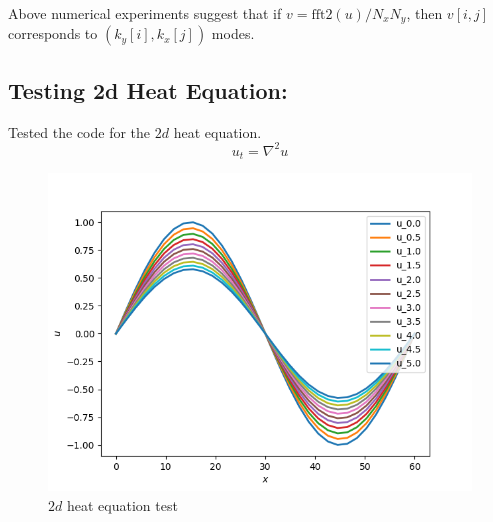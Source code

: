 \documentclass{article}
\begin{document}
Above numerical experiments suggest that if $v = \textrm{fft2}(u)/N_{x}N_{y}$, then $v[i, j]$ corresponds to $(k_{y}[i], k_{x}[j])$ modes.

\subsection{Testing 2d Heat Equation:}
Tested the code for the $2d$ heat equation. 
\begin{equation}\label{eq:2dheat}
 u_{t} =  \nabla^{2}u 
\end{equation}

\begin{figure}[H]
        \centering
        \includegraphics[scale = 0.6]{Figs/ut_heat_fourier.png}
            \caption{$2d$ heat equation test}
        \label{fig:2d_heat_test}
\end{figure}

\end{document}

